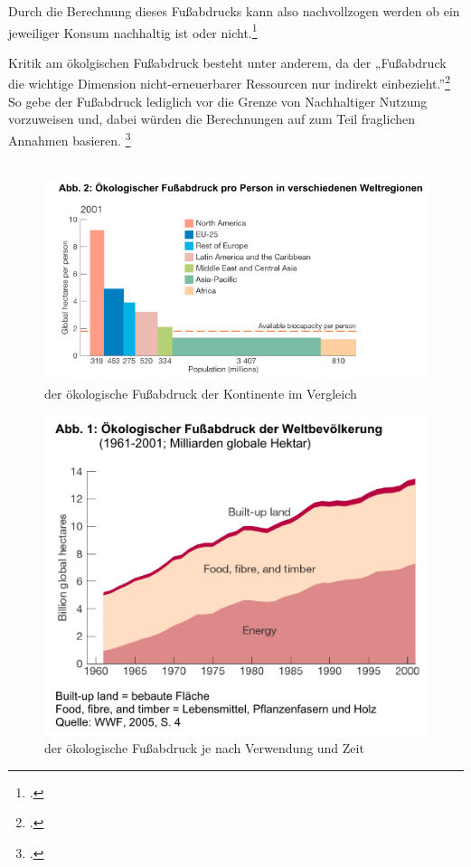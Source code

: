 \documentclass{scrartcl}
\begin{document}
Durch die Berechnung dieses Fußabdrucks kann also nachvollzogen werden ob ein jeweiliger Konsum nachhaltig ist oder nicht.\footcite[S.192]{AntjeFlade2015StadtStadtforschung}

Kritik am ökolgischen Fußabdruck besteht unter anderem, da der „Fußabdruck die wichtige Dimension nicht-erneuerbarer Ressourcen nur indirekt einbezieht.”\footcite[S.3]{StefanGiljum2007WissenschaftlicheFuabdruck} So gebe der Fußabdruck lediglich vor die Grenze von Nachhaltiger Nutzung vorzuweisen und, dabei würden die Berechnungen auf zum Teil fraglichen Annahmen basieren. \footcite[Vgl.][S.3f]{StefanGiljum2007WissenschaftlicheFuabdruck}
\\
\\
\begin{figure}[htbp]
\centering
\includegraphics[width=12cm]{image_folder/oekFussabdruckWelt.png}
\caption{der ökologische Fußabdruck der Kontinente im Vergleich}
\label{fig:oekFussabdruckWelt}
\end{figure}

\begin{figure}[htbp]
\centering
\includegraphics[width=12cm]{image_folder/oekFussabdruckZeit.png}
\caption{der ökologische Fußabdruck je nach Verwendung und Zeit}
\label{fig: oekFussabdruckZeit}
\end{figure}
\end{document}
